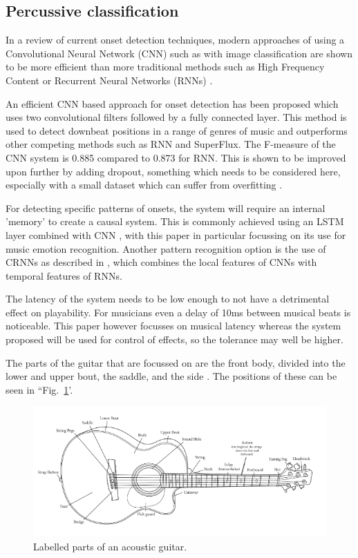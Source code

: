 \documentclass[conference]{IEEEtran}
\begin{document}
\subsection{Percussive classification}

In a review of current onset detection techniques, modern approaches of using a Convolutional Neural Network (CNN) such as with image classification are shown to be more efficient than 
more traditional methods such as High Frequency Content or Recurrent Neural Networks (RNNs) \cite{b2}.

An efficient CNN based approach for onset detection has been proposed \cite{b1} which uses two convolutional filters followed by a fully connected layer. This method is used to detect
downbeat positions in a range of genres of music and outperforms other competing methods such as RNN and SuperFlux. The F-measure of the CNN system is 0.885 compared to 0.873 for RNN. This
is shown to be improved upon further by adding dropout, something which needs to be considered here, especially with a small dataset which can suffer from overfitting \cite{b8}.

For detecting specific patterns of onsets, the system will require an internal 'memory' to create a causal system. This is commonly achieved using an LSTM layer combined with CNN \cite{b6}, with this paper in
particular focussing on its use for music emotion recognition. Another pattern recognition option is the use of CRNNs as described in \cite{b7}, which combines the local features of CNNs with temporal features of RNNs.

The latency of the system needs to be low enough to not have a detrimental effect on playability. For musicians even a delay of 10ms between musical beats \cite{b4} is noticeable. This paper however
focusses on musical latency whereas the system proposed will be used for control of effects, so the tolerance may well be higher. 

The parts of the guitar that are focussed on are the front body, divided into the lower and upper bout, the saddle, and the side \cite{b3}. The positions of these can be seen in ``Fig.~\ref{guitar}'.

\begin{figure}[htbp]
    \centerline{\includegraphics[scale=0.4]{guitar.png}}
    \caption{Labelled parts of an acoustic guitar. \cite{b3}}
    \label{guitar}
    \end{figure}
\end{document}
